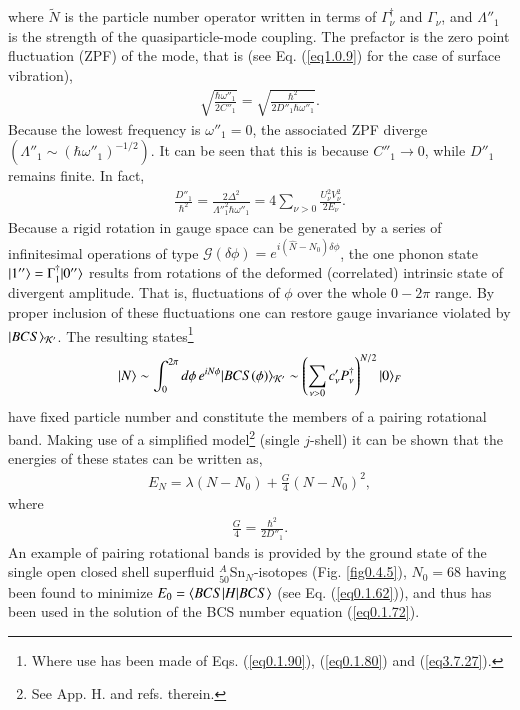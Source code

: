 where $\tilde N$ is the particle number operator written in terms of $\Gamma^\dagger_\nu$ and $\Gamma_\nu$, and $\Lambda''_1$ is the strength of the quasiparticle-mode coupling. The prefactor is the zero point fluctuation (ZPF) of the mode, that is (see Eq. (\ref{eq1.0.9}) for the case of surface vibration),
\begin{align}\label{eq0.1.99}
\sqrt{\frac{\hbar\omega''_1}{2C''_1}}=\sqrt{\frac{\hbar^2}{2D''_1\hbar\omega''_1}}.
\end{align}
Because the lowest frequency is $\omega''_1=0$, the associated ZPF diverge $(\Lambda''_1\sim(\hbar\omega''_1)^{-1/2})$. It can be seen that this is because $C''_1\to0$, while $D''_1$ remains finite. In fact,
\begin{align}\label{eq0.1.100}
\frac{D''_1}{\hbar^2}=\frac{2\Delta^2}{\Lambda''^2_1\hbar\omega''_1}=4\sum_{\nu>0}\frac{U^2_\nu V^2_\nu}{2E_\nu}.
\end{align}
 Because a rigid rotation in gauge space can be generated by a series of infinitesimal operations of type $\mathcal G(\delta\phi)=e^{i(\hat N-N_0)\delta\phi}$, the one phonon state $|{1''} \rangle=\Gamma^\dagger_1|{0''} \rangle$ results from rotations of the deformed (correlated) intrinsic state of divergent amplitude. That is, fluctuations of $\phi$ over the whole $0-2\pi$ range. By proper inclusion of these fluctuations one can restore gauge invariance violated by $|{BCS} \rangle_{\mathcal K'}$. The resulting states\footnote{Where use has been made of Eqs. (\ref{eq0.1.90}), (\ref{eq0.1.80}) and (\ref{eq3.7.27}).}
\begin{align}\label{eq0.1.101}
|{N} \rangle\sim\int^{2\pi}_0d\phi\,e^{iN\phi}|{BCS(\phi)} \rangle_{\mathcal K'}\sim\left(\sum_{\nu>0}c'_\nu P^\dagger_\nu\right)^{N/2}|{0} \rangle_F
\end{align}
have  fixed  particle number and constitute the members of a pairing rotational band. Making use of a simplified model\footnote{See \cite{Brink:05} App. H. and refs. therein.} (single $j$-shell) it can be shown that the energies of these states can be written as,
\begin{align}\label{eq0.1.102}
E_N=\lambda(N-N_0)+\frac{G}{4}\left(N-N_0\right)^2,
\end{align}
where 
\begin{align}\label{eq0.1.103}
\frac{G}{4}=\frac{\hbar^2}{2D''_1}.
\end{align}
An example of pairing rotational bands is provided by the ground state of the single open closed shell superfluid  $^A_{50}$Sn$_N$-isotopes (Fig. \ref{fig0.4.5}), $N_0=68$ having been found to minimize $E_0=\langle {BCS|H|BCS} \rangle$ (see Eq. (\ref{eq0.1.62})), and thus has been used in the solution of the BCS number equation (\ref{eq0.1.72}). 



